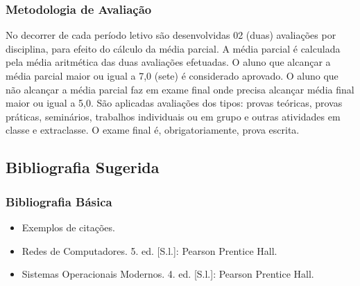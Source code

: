 \begin{frame}[t]\frametitle{Metodologia de Avaliação}

  \begin{block}{}
    \justifying{}
    \Large
    No decorrer de cada período letivo são desenvolvidas 02 (duas) avaliações por disciplina, para efeito do cálculo da média parcial. A média parcial é calculada pela média aritmética das duas avaliações efetuadas. O aluno que alcançar a média parcial maior ou igual a 7,0 (sete) é considerado aprovado. O aluno que não alcançar a média parcial faz em exame final onde precisa alcançar média final maior ou igual a 5,0. São aplicadas avaliações dos tipos: provas teóricas, provas práticas, seminários, trabalhos individuais ou em grupo e outras atividades em classe e extraclasse. O exame final é, obrigatoriamente, prova escrita.
  \end{block}

\end{frame}



\subsection[Bibliografia Sugerida]{Bibliografia Sugerida}\label{subsec:plano-ensino-bibliografia}



\begin{frame}[t]\frametitle{Bibliografia Básica}

  \begin{itemize}
    \justifying{}
    \setlength\itemsep{1em}
    \item Exemplos de citações.
    \item Redes de Computadores. 5. ed. [S.l.]: Pearson Prentice Hall. \cite{Tanenbaum2011}
    \item Sistemas Operacionais Modernos. 4. ed. [S.l.]: Pearson Prentice Hall. \cite{Tanenbaum2016}
  \end{itemize}

\end{frame}



